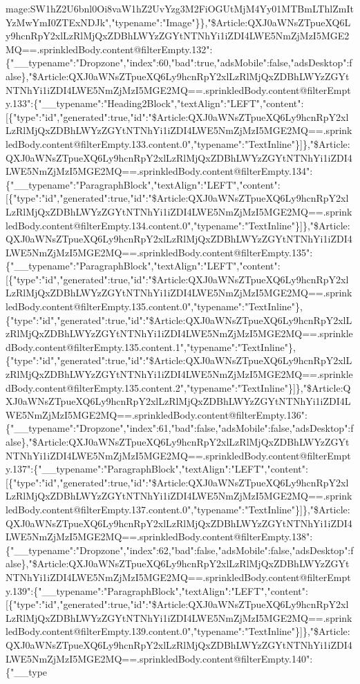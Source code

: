mage:SW1hZ2U6bnl0Oi8vaW1hZ2UvYzg3M2FiOGUtMjM4Yy01MTBmLThlZmItYzMwYmI0ZTExNDJk","typename":"Image"\}\},"\$Article:QXJ0aWNsZTpueXQ6Ly9hcnRpY2xlLzRlMjQxZDBhLWYzZGYtNTNhYi1iZDI4LWE5NmZjMzI5MGE2MQ==.sprinkledBody.content@filterEmpty.132":\{"\_\_typename":"Dropzone","index":60,"bad":true,"adsMobile":false,"adsDesktop":false\},"\$Article:QXJ0aWNsZTpueXQ6Ly9hcnRpY2xlLzRlMjQxZDBhLWYzZGYtNTNhYi1iZDI4LWE5NmZjMzI5MGE2MQ==.sprinkledBody.content@filterEmpty.133":\{"\_\_typename":"Heading2Block","textAlign":"LEFT","content":{[}\{"type":"id","generated":true,"id":"\$Article:QXJ0aWNsZTpueXQ6Ly9hcnRpY2xlLzRlMjQxZDBhLWYzZGYtNTNhYi1iZDI4LWE5NmZjMzI5MGE2MQ==.sprinkledBody.content@filterEmpty.133.content.0","typename":"TextInline"\}{]}\},"\$Article:QXJ0aWNsZTpueXQ6Ly9hcnRpY2xlLzRlMjQxZDBhLWYzZGYtNTNhYi1iZDI4LWE5NmZjMzI5MGE2MQ==.sprinkledBody.content@filterEmpty.134":\{"\_\_typename":"ParagraphBlock","textAlign":"LEFT","content":{[}\{"type":"id","generated":true,"id":"\$Article:QXJ0aWNsZTpueXQ6Ly9hcnRpY2xlLzRlMjQxZDBhLWYzZGYtNTNhYi1iZDI4LWE5NmZjMzI5MGE2MQ==.sprinkledBody.content@filterEmpty.134.content.0","typename":"TextInline"\}{]}\},"\$Article:QXJ0aWNsZTpueXQ6Ly9hcnRpY2xlLzRlMjQxZDBhLWYzZGYtNTNhYi1iZDI4LWE5NmZjMzI5MGE2MQ==.sprinkledBody.content@filterEmpty.135":\{"\_\_typename":"ParagraphBlock","textAlign":"LEFT","content":{[}\{"type":"id","generated":true,"id":"\$Article:QXJ0aWNsZTpueXQ6Ly9hcnRpY2xlLzRlMjQxZDBhLWYzZGYtNTNhYi1iZDI4LWE5NmZjMzI5MGE2MQ==.sprinkledBody.content@filterEmpty.135.content.0","typename":"TextInline"\},\{"type":"id","generated":true,"id":"\$Article:QXJ0aWNsZTpueXQ6Ly9hcnRpY2xlLzRlMjQxZDBhLWYzZGYtNTNhYi1iZDI4LWE5NmZjMzI5MGE2MQ==.sprinkledBody.content@filterEmpty.135.content.1","typename":"TextInline"\},\{"type":"id","generated":true,"id":"\$Article:QXJ0aWNsZTpueXQ6Ly9hcnRpY2xlLzRlMjQxZDBhLWYzZGYtNTNhYi1iZDI4LWE5NmZjMzI5MGE2MQ==.sprinkledBody.content@filterEmpty.135.content.2","typename":"TextInline"\}{]}\},"\$Article:QXJ0aWNsZTpueXQ6Ly9hcnRpY2xlLzRlMjQxZDBhLWYzZGYtNTNhYi1iZDI4LWE5NmZjMzI5MGE2MQ==.sprinkledBody.content@filterEmpty.136":\{"\_\_typename":"Dropzone","index":61,"bad":false,"adsMobile":false,"adsDesktop":false\},"\$Article:QXJ0aWNsZTpueXQ6Ly9hcnRpY2xlLzRlMjQxZDBhLWYzZGYtNTNhYi1iZDI4LWE5NmZjMzI5MGE2MQ==.sprinkledBody.content@filterEmpty.137":\{"\_\_typename":"ParagraphBlock","textAlign":"LEFT","content":{[}\{"type":"id","generated":true,"id":"\$Article:QXJ0aWNsZTpueXQ6Ly9hcnRpY2xlLzRlMjQxZDBhLWYzZGYtNTNhYi1iZDI4LWE5NmZjMzI5MGE2MQ==.sprinkledBody.content@filterEmpty.137.content.0","typename":"TextInline"\}{]}\},"\$Article:QXJ0aWNsZTpueXQ6Ly9hcnRpY2xlLzRlMjQxZDBhLWYzZGYtNTNhYi1iZDI4LWE5NmZjMzI5MGE2MQ==.sprinkledBody.content@filterEmpty.138":\{"\_\_typename":"Dropzone","index":62,"bad":false,"adsMobile":false,"adsDesktop":false\},"\$Article:QXJ0aWNsZTpueXQ6Ly9hcnRpY2xlLzRlMjQxZDBhLWYzZGYtNTNhYi1iZDI4LWE5NmZjMzI5MGE2MQ==.sprinkledBody.content@filterEmpty.139":\{"\_\_typename":"ParagraphBlock","textAlign":"LEFT","content":{[}\{"type":"id","generated":true,"id":"\$Article:QXJ0aWNsZTpueXQ6Ly9hcnRpY2xlLzRlMjQxZDBhLWYzZGYtNTNhYi1iZDI4LWE5NmZjMzI5MGE2MQ==.sprinkledBody.content@filterEmpty.139.content.0","typename":"TextInline"\}{]}\},"\$Article:QXJ0aWNsZTpueXQ6Ly9hcnRpY2xlLzRlMjQxZDBhLWYzZGYtNTNhYi1iZDI4LWE5NmZjMzI5MGE2MQ==.sprinkledBody.content@filterEmpty.140":\{"\_\_type